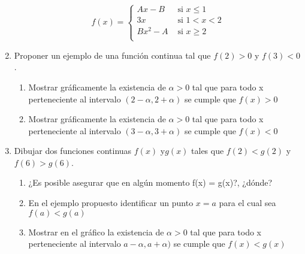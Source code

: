 \documentclass[12pt]{article}
\newtheorem*{myteo}{Teorema} %
\theoremstyle{definition}
\begin{document}
\begin{enumerate}
\begin{equation*}
f(x) =
\begin{cases} 
Ax-B & \text{  si   } x \leq 1 \\
 3x  & \text{  si   } 1< x < 2 \\
Bx^{2}-A & \text{  si   } x \geq 2 \\
\end{cases}
\end{equation*}
  
\vspace{0.3 cm}

\item Proponer un ejemplo de una función continua tal que $f(2) > 0$ y  $f(3) < 0$. 
\begin{enumerate}
\item  Mostrar gráficamente la existencia de $\alpha > 0$  tal que para todo x perteneciente al intervalo $(2-\alpha, 2+\alpha)$  se cumple que $f(x)>0$
\item  Mostrar gráficamente la existencia de $\alpha > 0$  tal que para todo x perteneciente al intervalo $(3-\alpha, 3+\alpha)$  se cumple que $f(x)<0$
\end{enumerate}


\vspace{0.3 cm}

\item  Dibujar dos funciones continuas $f(x)$ y$ g(x)$ tales que $f(2) < g(2)$  y  $f(6) > g(6)$.
\begin{enumerate}
\item  ¿Es posible asegurar que en algún momento f(x) = g(x)?, ¿dónde? 
\item En el ejemplo propuesto identificar un punto $x = a$ para el cual sea $f(a) < g(a)$ 
\item  Mostrar en el gráfico la existencia de $\alpha > 0$  tal que para todo x perteneciente al intervalo $a-\alpha, a+\alpha)$  se cumple que $f(x)<g(x)$
\end{enumerate}



\end{enumerate}
\end{document}
